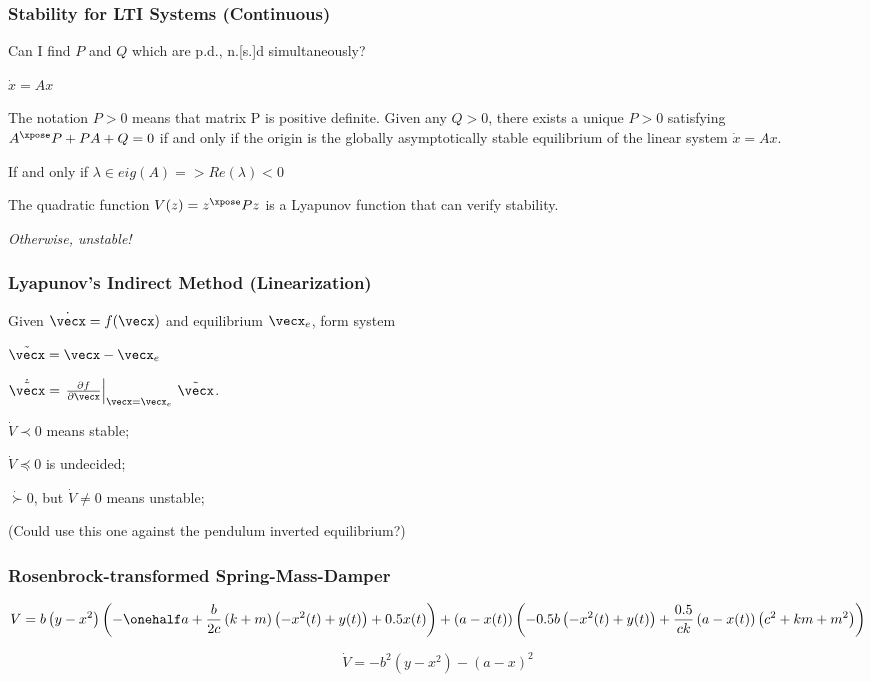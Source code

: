 \documentclass[12pt]{beamer}
\begin{document}
\begin{frame}
\frametitle{Stability for LTI Systems (Continuous)}


Can I find $P$ and $Q$ which are p.d., n.[s.]d simultaneously?

$\dot x = Ax$

The notation $P > 0$ means that matrix P is positive definite.
Given any $Q > 0$, there exists a unique $P > 0$ satisfying 
$A^\xpose P + P A + Q = 0$ if and only if the origin is the globally asymptotically stable equilibrium of the linear system $\dot x = A x$.

If and only if $\lambda \in eig(A) => Re(\lambda) < 0$

The quadratic function $V(z) = z^\xpose P z$ is a Lyapunov function that can verify stability.

\emph{Otherwise, unstable!}

\end{frame}







\begin{frame}
\frametitle{Lyapunov's Indirect Method (Linearization)}

Given $\dot \vecx = f(\vecx)$ and equilibrium $\vecx_e$,
form system

$\tilde\vecx = \vecx - \vecx_e$

$\dot{\tilde\vecx}
	= \left.
		\frac{\partial f }{\partial\vecx} \right|_{\vecx=\vecx_e}
		\, \tilde\vecx$.



$\dot V \prec 0$ means stable;

$\dot V \preceq 0$ is undecided;

$\dot \succ 0$, but $\dot V \neq 0$ means unstable;

(Could use this one against the pendulum inverted equilibrium?)

\end{frame}







\begin{frame}
\frametitle{Rosenbrock-transformed Spring-Mass-Damper}

\begin{equation}
V = b \left( y - x^{2}\right)
	\left(
		-\onehalf a + \frac{b}{2c} \left(k + m\right) \left(- x^{2}{\left (t \right )} + y{\left (t \right )}\right) + 0.5 x{\left (t \right )}\right)
		+ \left(a - x{\left (t \right )}\right) \left(- 0.5 b \left(- x^{2}{\left (t \right )} + y{\left (t \right )}\right) + \frac{0.5}{c k} \left(a - x{\left (t \right )}\right) \left(c^{2} + k m + m^{2}\right)\right)
\end{equation}

\begin{equation}
\dot V = -b^2 \left( y - x^2 \right) - \left( a - x \right)^2
\end{equation}

\end{frame}
\end{document}
